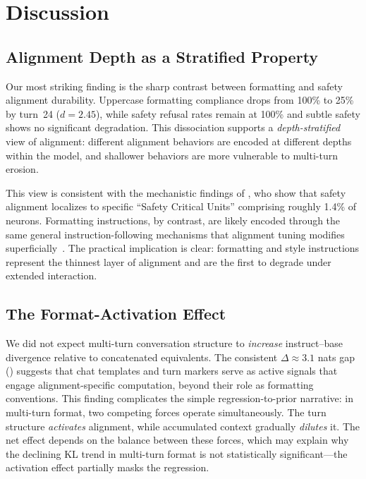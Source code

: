 \section{Discussion}
\label{sec:discussion}

\subsection{Alignment Depth as a Stratified Property}

Our most striking finding is the sharp contrast between formatting and safety alignment durability. Uppercase formatting compliance drops from 100\% to 25\% by turn~24 ($d = 2.45$), while safety refusal rates remain at 100\% and subtle safety shows no significant degradation. This dissociation supports a \emph{depth-stratified} view of alignment: different alignment behaviors are encoded at different depths within the model, and shallower behaviors are more vulnerable to multi-turn erosion.

This view is consistent with the mechanistic findings of \citet{li2024ssah}, who show that safety alignment localizes to specific ``Safety Critical Units'' comprising roughly 1.4\% of neurons. Formatting instructions, by contrast, are likely encoded through the same general instruction-following mechanisms that alignment tuning modifies superficially~\citep{lin2024urial}. The practical implication is clear: formatting and style instructions represent the thinnest layer of alignment and are the first to degrade under extended interaction.

\subsection{The Format-Activation Effect}

We did not expect multi-turn conversation structure to \emph{increase} instruct--base divergence relative to concatenated equivalents. The consistent $\Delta \approx 3.1$ nats gap () suggests that chat templates and turn markers serve as active signals that engage alignment-specific computation, beyond their role as formatting conventions. This finding complicates the simple regression-to-prior narrative: in multi-turn format, two competing forces operate simultaneously. The turn structure \emph{activates} alignment, while accumulated context gradually \emph{dilutes} it. The net effect depends on the balance between these forces, which may explain why the declining KL trend in multi-turn format is not statistically significant---the activation effect partially masks the regression.

